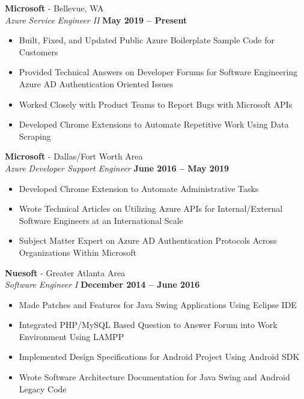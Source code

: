 \documentclass[margin,line]{resume}
\begin{document}
\begin{resume}
	\textbf{Microsoft} - Bellevue, WA \vspace{1mm}\\\vspace{1mm}
	\textsl{Azure Service Engineer II} \hfill \textbf{May 2019 -- Present}
	\begin{itemize}
		\item Built, Fixed, and Updated Public Azure Boilerplate Sample Code for Customers
		\item Provided Technical Answers on Developer Forums for Software Engineering \\Azure AD Authentication Oriented Issues
		\item Worked Closely with Product Teams to Report Bugs with Microsoft APIs
		\item Developed Chrome Extensions to Automate Repetitive Work Using Data Scraping
	\end{itemize}
		
	\textbf{Microsoft} - Dallas/Fort Worth Area\vspace{1mm}\\\vspace{1mm}
	\textsl{Azure Developer Support Engineer} \hfill \textbf{June 2016 -- May 2019}
	\begin{itemize}
		 \item Developed Chrome Extension to Automate Administrative Tasks
		 \item Wrote Technical Articles on Utilizing Azure APIs for Internal/External Software Engineers at an International Scale
		 \item Subject Matter Expert on Azure AD Authentication Protocols Across Organizations Within Microsoft
	
	\end{itemize}

	\textbf{Nuesoft} - Greater Atlanta Area \vspace{1mm}\\\vspace{1mm}%
	\textsl{Software Engineer I} \hfill \textbf{December 2014 -- June 2016}
	\begin{itemize}
	 	\item Made Patches and Features for Java Swing Applications Using Eclipse IDE 
	 	\item Integrated PHP/MySQL Based Question to Answer Forum into Work Environment Using LAMPP
	 	\item Implemented Design Specifications for Android Project Using Android SDK
	 	\item Wrote Software Architecture Documentation for Java Swing and Android Legacy Code 
	\end{itemize}


\end{resume}
\end{document}
